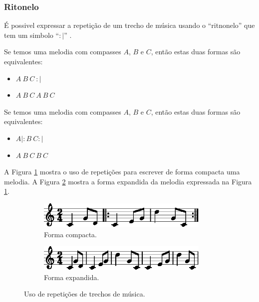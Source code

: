 \subsubsection{Ritonelo}
É possivel expressar a repetição de um trecho de música usando o ``ritnonelo'' 
que tem um simbolo ``$:|$'' \cite[pp. 237]{medteoria} \cite[pp. 168]{cardoso1973curso}.

\begin{example}Se temos uma melodia com compasses $A$, $B$ e $C$,
então estas duas formas são equivalentes:
\begin{itemize}
\item $A~B~C~:|$
\item $A~B~C~A~B~C$
\end{itemize}
\end{example}


\begin{example}Se temos uma melodia com compasses $A$, $B$ e $C$,
então estas duas formas são equivalentes:
\begin{itemize}
\item $ A|:B~C:|$
\item $A~B~C~B~C$
\end{itemize}
\end{example}

A Figura \ref{fig:ritonelo1-1} mostra o uso de repetições para escrever de forma compacta uma melodia.
A Figura \ref{fig:ritonelo2-1} mostra a forma expandida da melodia expressada na Figura \ref{fig:ritonelo1-1}.
\begin{figure}[!h]
\centering
    \begin{subfigure}[b]{0.75\textwidth}
        \includegraphics[width=0.9\textwidth]{chapters/cap-musica-basica/ritonelo1-1.eps}
        \caption{Forma compacta.}
        \label{fig:ritonelo1-1}
    \end{subfigure}
    \begin{subfigure}[b]{0.75\textwidth}
        \includegraphics[width=0.9\textwidth]{chapters/cap-musica-basica/ritonelo2-1.eps}
        \caption{Forma expandida.}
        \label{fig:ritonelo2-1}
    \end{subfigure}
\caption{Uso de repetições de trechos de música.}
\label{fig:ritonelo1}
\end{figure}

